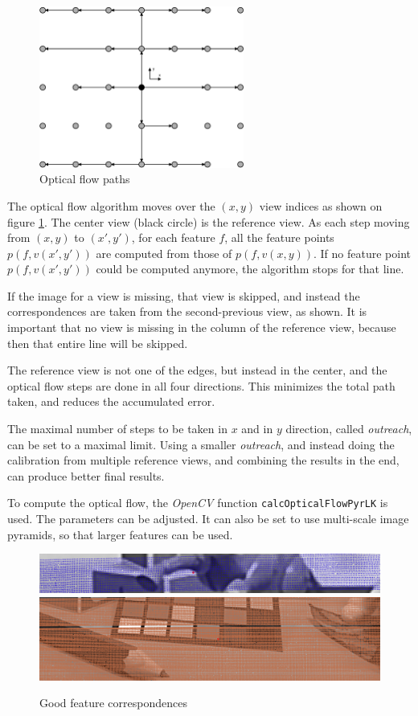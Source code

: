 \documentclass{scrreprt}
\begin{document}
\begin{figure}
\centering
\includegraphics[width=0.6\textwidth]{opticalflow.pdf}
\caption{Optical flow paths}
\label{fig:opticalflow}
\end{figure}

The optical flow algorithm moves over the $(x,y)$ view indices as shown on figure \ref{fig:opticalflow}. The center view (black circle) is the reference view. As each step moving from $(x,y)$ to $(x',y')$, for each feature $f$, all the feature points $p(f,v(x',y'))$ are computed from those of $p(f,v(x,y))$. If no feature point $p(f,v(x',y'))$ could be computed anymore, the algorithm stops for that line.

If the image for a view is missing, that view is skipped, and instead the correspondences are taken from the second-previous view, as shown. It is important that no view is missing in the column of the reference view, because then that entire line will be skipped.

The reference view is not one of the edges, but instead in the center, and the optical flow steps are done in all four directions. This minimizes the total path taken, and reduces the accumulated error.

The maximal number of steps to be taken in $x$ and in $y$ direction, called \emph{outreach}, can be set to a maximal limit. Using a smaller \emph{outreach}, and instead doing the calibration from multiple reference views, and combining the results in the end, can produce better final results.

To compute the optical flow, the \emph{OpenCV} function \texttt{calcOpticalFlowPyrLK} is used. The parameters can be adjusted. It can also be set to use multi-scale image pyramids, so that larger features can be used.

\begin{figure}
\includegraphics[width=\textwidth]{ofgood1.png}
\includegraphics[width=\textwidth]{ofgood2.png}
\caption{Good feature correspondences}
\label{fig:ofgood}
\end{figure}
\end{document}
